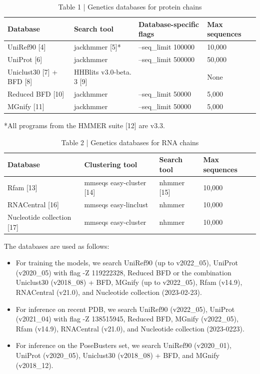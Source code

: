 \documentclass[10pt]{article}
\begin{document}
\begin{table}[h]
\begin{center}
\captionsetup{labelformat=empty}
\caption{Table 1 | Genetics databases for protein chains}
\begin{tabular}{|l|l|l|l|}
\hline
Database & Search tool & Database-specific flags & Max sequences \\
\hline
UniRef90 [4] & jackhmmer [5]* & --seq\_limit 100000 & 10,000 \\
\hline
UniProt [6] & jackhmmer & --seq\_limit 500000 & 50,000 \\
\hline
Uniclust30 [7] + BFD [8] & HHBlits v3.0-beta. 3 [9] &  & None \\
\hline
Reduced BFD [10] & jackhmmer & --seq\_limit 50000 & 5,000 \\
\hline
MGnify [11] & jackhmmer & --seq\_limit 50000 & 5,000 \\
\hline
\end{tabular}
\end{center}
\end{table}

*All programs from the HMMER suite [12] are v3.3.

\begin{table}[h]
\begin{center}
\captionsetup{labelformat=empty}
\caption{Table 2 | Genetics databases for RNA chains}
\begin{tabular}{llll}
\hline
Database & Clustering tool & Search tool & Max sequences \\
\hline
Rfam [13] & mmseqs easy-cluster [14] & nhmmer [15] & 10,000 \\
RNACentral [16] & mmseqs easy-linclust & nhmmer & 10,000 \\
Nucleotide collection [17] & mmseqs easy-cluster & nhmmer & 10,000 \\
\hline
\end{tabular}
\end{center}
\end{table}

The databases are used as follows:

\begin{itemize}
  \item For training the models, we search UniRef90 (up to v2022\_05), UniProt (v2020\_05) with flag -Z 119222328, Reduced BFD or the combination Uniclust30 (v2018\_08) + BFD, MGnify (up to v2022\_05), Rfam (v14.9), RNACentral (v21.0), and Nucleotide collection (2023-02-23).
  \item For inference on recent PDB, we search UniRef90 (v2022\_05), UniProt (v2021\_04) with flag -Z 138515945, Reduced BFD, MGnify (v2022\_05), Rfam (v14.9), RNACentral (v21.0), and Nucleotide collection (2023-0223).
  \item For inference on the PoseBusters set, we search UniRef90 (v2020\_01), UniProt (v2020\_05), Uniclust30 (v2018\_08) + BFD, and MGnify (v2018\_12).
\end{itemize}
\end{document}
